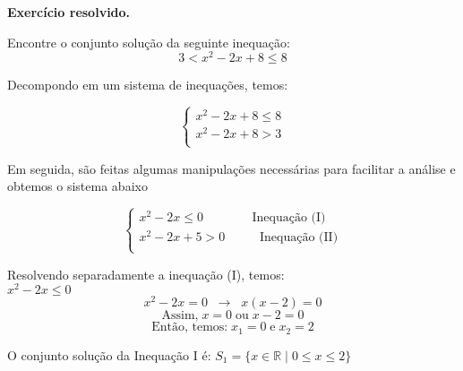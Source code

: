     \noindent
	\textbf{Exercício resolvido.}
	
	Encontre o conjunto solução da seguinte inequação:
	\[
	3 < x^2 - 2x +8 \le 8
	\]
	
	Decompondo em um sistema de inequações, temos:
	
	\[ \left\{  
	\begin{array}{c}
		x^2 - 2x + 8 \le 8\\
		x^2 - 2x + 8 > 3\\
	\end{array} 
	\right.
	\]
	
	Em seguida, são feitas algumas manipulações necessárias para facilitar a análise e obtemos o sistema abaixo
	
	\[ \left\{  
	\begin{array}{c}
		x^2 - 2x \le 0  \;\;\;\;\;\;\;\;\;\;\;\;\;\;\text{Inequação (I)}\\
		x^2 - 2x + 5 > 0 \;\;\;\;\;\;\;\;\;\; \text{Inequação (II)}\\
	\end{array} 
	\right.
	\]
	
	Resolvendo separadamente a inequação (I), temos:\\
	$ x^2 - 2x\le 0$\\
	\[
	x^2 - 2x = 0 \;\; \longrightarrow \;\; x(x-2)
	=0\]
	\[
	\text{Assim,} \; x=0 \; \text{ou} \; x-2=0
	\]
	\[
	\text{Então, temos:} \; x_1=0 \; \text{e} \; x_2 = 2
	\]
        \begin{center}
    \end{center}
    O conjunto solução da Inequação I é: $  S_1 = \{ x \in \mathbb{R} \mid 0 \le x \le 2 \} $
 
